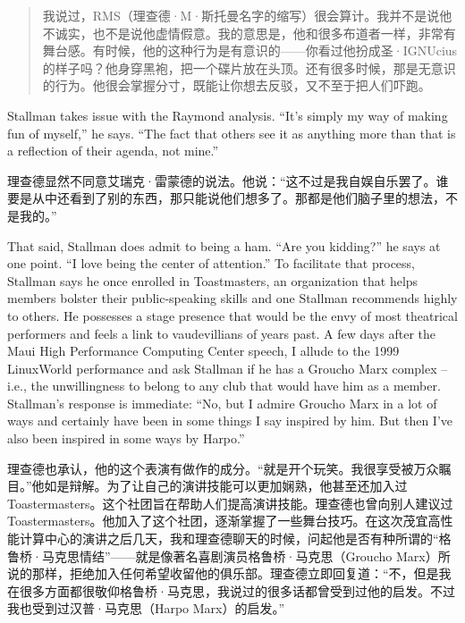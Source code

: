 \ifdefined\chs
\begin{quote}
我说过，RMS（理查德·M·斯托曼名字的缩写）很会算计。我并不是说他不诚实，也不是说他虚情假意。我的意思是，他和很多布道者一样，非常有舞台感。有时候，他的这种行为是有意识的——你看过他扮成圣·IGNUcius的样子吗？他身穿黑袍，把一个碟片放在头顶。还有很多时候，那是无意识的行为。他很会掌握分寸，既能让你想去反驳，又不至于把人们吓跑。
\end{quote}
\fi

\ifdefined\eng
Stallman takes issue with the Raymond analysis. ``It's simply my way of making fun of myself,'' he says. ``The fact that others see it as anything more than that is a reflection of their agenda, not mine.''
\fi

\ifdefined\chs
理查德显然不同意艾瑞克·雷蒙德的说法。他说：``这不过是我自娱自乐罢了。谁要是从中还看到了别的东西，那只能说他们想多了。那都是他们脑子里的想法，不是我的。''
\fi

\ifdefined\eng
That said, Stallman does admit to being a ham. ``Are you kidding?'' he says at one point. ``I love being the center of attention.'' To facilitate that process, Stallman says he once enrolled in Toastmasters, an organization that helps members bolster their public-speaking skills and one Stallman recommends highly to others. He possesses a stage presence that would be the envy of most theatrical performers and feels a link to vaudevillians of years past. A few days after the Maui High Performance Computing Center speech, I allude to the 1999 LinuxWorld performance and ask Stallman if he has a Groucho Marx complex -- i.e., the unwillingness to belong to any club that would have him as a member. Stallman's response is immediate: ``No, but I admire Groucho Marx in a lot of ways and certainly have been in some things I say inspired by him. But then I've also been inspired in some ways by Harpo.''
\fi

\ifdefined\chs
理查德也承认，他的这个表演有做作的成分。``就是开个玩笑。我很享受被万众瞩目。''他如是辩解。为了让自己的演讲技能可以更加娴熟，他甚至还加入过Toastermasters。这个社团旨在帮助人们提高演讲技能。理查德也曾向别人建议过Toastermasters。他加入了这个社团，逐渐掌握了一些舞台技巧。在这次茂宜高性能计算中心的演讲之后几天，我和理查德聊天的时候，问起他是否有种所谓的``格鲁桥·马克思情结''——就是像著名喜剧演员格鲁桥·马克思（Groucho Marx）所说的那样，拒绝加入任何希望收留他的俱乐部。理查德立即回复道：``不，但是我在很多方面都很敬仰格鲁桥·马克思，我说过的很多话都曾受到过他的启发。不过我也受到过汉普·马克思（Harpo Marx）的启发。''
\fi


